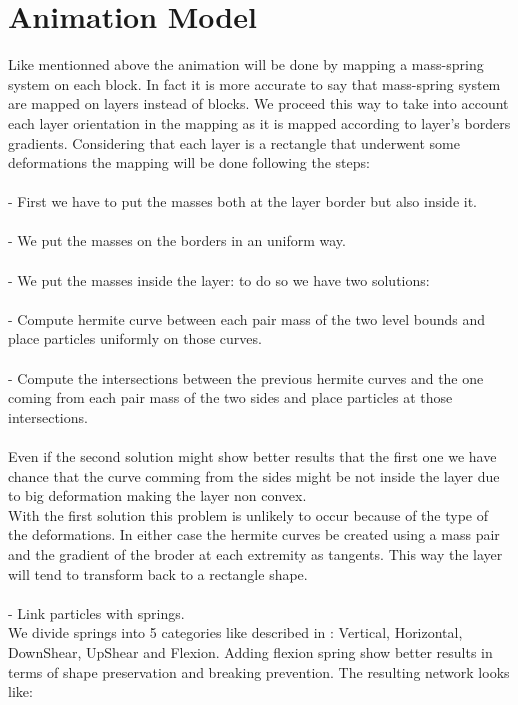 \documentclass[12pt, a4paper]{memoir} %
\begin{document}
\section{Animation Model}

Like mentionned above the animation will be done by mapping a mass-spring system on each block. In fact it is more accurate to say that mass-spring system are mapped on layers instead of blocks. We proceed this way to take into account each layer orientation in the mapping as it is mapped according to layer's borders gradients. Considering that each layer is a rectangle that underwent some deformations the mapping will be done following the steps:	\\\\		
\indent	- First we have to put the masses both at the layer border but also inside it.\\\\
\indent	- We put the masses on the borders in an uniform way.\\\\
\indent	- We put the masses inside the layer: to do so we have two solutions:\\\\
\indent \indent	- Compute hermite curve between each pair mass of the two level bounds and place particles uniformly on those curves.\\\\
\indent \indent	- Compute the intersections between the previous hermite curves and the one coming from each pair mass of the two sides and place particles at those intersections.\\\\
	Even if the second solution might show better results that the first one we have chance that the curve comming from the sides might be not inside the layer due to big deformation making the layer non convex. \\With the first solution this problem is unlikely to occur because of the type of the deformations. In either case the hermite curves be created using a mass pair and the gradient of the broder at each extremity as tangents. This way the layer will tend to transform back to a rectangle shape.\\\\
\indent	- Link particles with springs. \\We divide springs into 5 categories like described in \citep{cloth}: Vertical, Horizontal, DownShear, UpShear and Flexion. Adding flexion spring show better results in terms of shape preservation and breaking prevention. The resulting network looks like:\\
	
\end{document}
